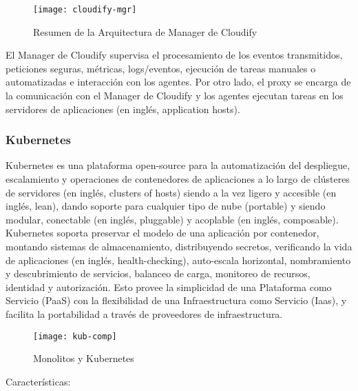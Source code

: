 \begin{figure}[H]
    \centering
    \texttt{[image: cloudify-mgr]}
    \caption{Resumen de la Arquitectura de  Manager de Cloudify \protect\cite{Cloudify2016-ze}}
    \label{fig:cloudify-mgr}
\end{figure}

El Manager de Cloudify supervisa el procesamiento de los eventos transmitidos, peticiones seguras, métricas, logs/eventos, ejecución de tareas manuales o automatizadas e interacción con los agentes. Por otro lado, el proxy se encarga de la comunicación con el Manager de Cloudify y los agentes ejecutan tareas en los servidores de aplicaciones (en inglés, application hosts).


\subsubsection{Kubernetes}

Kubernetes es una plataforma open-source para la automatización del despliegue, escalamiento y  operaciones de contenedores de aplicaciones a lo largo de clústeres de servidores (en inglés, clusters of hosts) siendo a la vez ligero y accesible (en inglés, lean), dando soporte para cualquier tipo de nube (portable) y siendo modular, conectable (en inglés, pluggable) y acoplable (en inglés, composable).
Kubernetes soporta preservar el modelo de una aplicación por contenedor, montando sistemas de almacenamiento, distribuyendo secretos, verificando la vida de aplicaciones (en inglés, health-checking), auto-escala horizontal, nombramiento y descubrimiento de servicios, balanceo de carga, monitoreo de recursos, identidad y autorización.
Esto provee la simplicidad de una Plataforma como Servicio (PaaS) con la flexibilidad de una Infraestructura como Servicio (Iaas), y facilita la portabilidad a través de proveedores de infraestructura.

\begin{figure}[H]
    \centering
    \texttt{[image: kub-comp]}
    \caption{ Monolitos y Kubernetes \protect\cite{Kubernetes2016-li}}
    \label{fig:kub-comp}
\end{figure}

Características:
 
